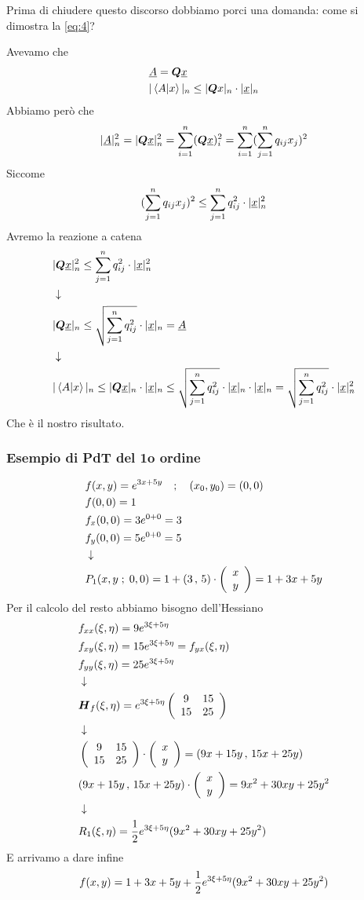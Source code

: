 Prima di chiudere questo discorso dobbiamo porci una domanda: come si dimostra la \ref{eq:4}?

Avevamo che
\begin{align}
	&\underline{A}= \boldsymbol{Q} \underline{x}\\
	&|\braket{A|x}|_n\leq |\boldsymbol{Q} x|_n \cdot |\underline{x}|_n
\end{align}
Abbiamo però che
\begin{align}
	|\underline{A}|^2_n=|\boldsymbol{Q} \underline{x}|_n^2 = \sum_{i=1}^{n} (\boldsymbol{Q} \underline{x})_i^2 = \sum_{i=1}^{n} (\sum_{j=1}^{n}q_{ij}x_j)^2
\end{align}
Siccome
\begin{align}
	(\sum_{j=1}^{n}q_{ij}x_j)^2 \leq \sum_{j=1}^{n}q_{ij}^2 \cdot |\underline{x}|_n^2
\end{align}
Avremo la reazione a catena
\begin{align}
	&|\boldsymbol{Q} \underline{x}|_n^2 \leq \sum_{j=1}^{n}q_{ij}^2 \cdot |\underline{x}|_n^2 \nonumber \\ &\downarrow \nonumber \\
	&|\boldsymbol{Q} \underline{x}|_n \leq \sqrt{\sum_{j=1}^{n}q_{ij}^2} \cdot |\underline{x}|_n = \underline{A} \nonumber \\ &\downarrow \nonumber \\
	&|\braket{A|x}|_n\leq |\boldsymbol{Q} \underline{x}|_n \cdot |\underline{x}|_n \leq 
	\sqrt{\sum_{j=1}^{n}q_{ij}^2} \cdot |\underline{x}|_n \cdot |\underline{x}|_n = \sqrt{\sum_{j=1}^{n}q_{ij}^2} \cdot |\underline{x}|_n^2 
\end{align}
Che è il nostro risultato.

\newpage

\subsubsection{Esempio di PdT del 1o ordine}

\begin{align}
	&f(x,y)= e^{3x + 5y} \quad ; \quad (x_0,y_0)=(0,0) \\
	&f(0,0)=1 \nonumber \\
	&f_x(0,0)=3 e^{0+0} = 3 \nonumber \\
	&f_y(0,0)=5 e^{0+0} = 5 \nonumber \\ &\downarrow \nonumber \\
	&P_1(x,y \; ; \; 0,0) = 1 + (3 \, , \, 5) \cdot \left( \begin{array}{cc} x \\ y \end{array} \right) = 1 + 3x + 5y
\end{align}
Per il calcolo del resto abbiamo bisogno dell'Hessiano
\begin{align}
	& f_{xx}(\xi,\eta)= 9 e^{3\xi + 5\eta} \nonumber \\
	& f_{xy}(\xi,\eta) = 15 e^{3\xi + 5\eta} = f_{yx}(\xi,\eta)\nonumber \\
	& f_{yy}(\xi,\eta) = 25 e^{3\xi + 5\eta} \nonumber \\ &\downarrow \nonumber \\
	&\boldsymbol{H}_{f} (\xi ,\eta)= e^{3\xi + 5\eta} \left( \begin{array}{ccc} 9 & 15 \\ 15 & 25 \end{array} \right) \nonumber \\ &\downarrow \nonumber \\
	&\left( \begin{array}{ccc} 9 & 15 \\ 15 & 25 \end{array} \right) \cdot  \left( \begin{array}{cc} x \\ y \end{array} \right) =  (9x + 15 y \, , \, 15x + 25 y) \nonumber \\
	&(9x + 15 y \, , \, 15x + 25 y) \cdot \left( \begin{array}{cc} x \\ y \end{array} \right) = 9x^2 + 30 xy + 25 y^2 \nonumber \\ &\downarrow \nonumber \\
	&R_1(\xi,\eta) = \frac{1}{2} e^{3\xi + 5\eta} (9x^2 + 30 xy + 25 y^2 )
\end{align}
E arrivamo a dare infine
\begin{align}
	f(x,y)= 1 + 3x + 5y + \frac{1}{2} e^{3\xi + 5\eta} (9x^2 + 30 xy + 25 y^2)
\end{align}

